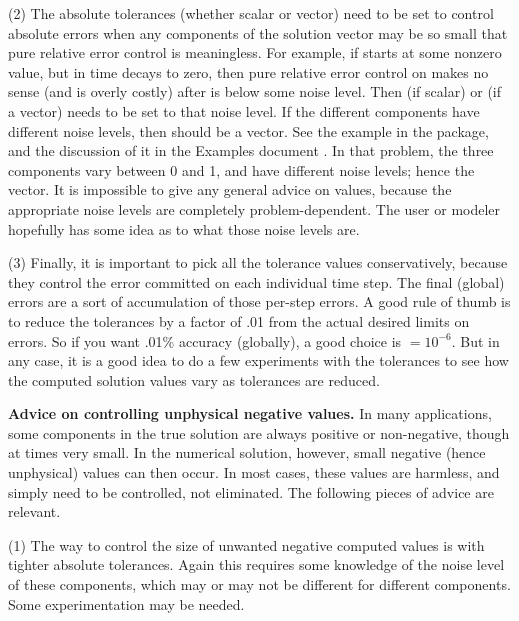(2) The absolute tolerances  (whether scalar or vector) need to
be set to control absolute errors when any components of the solution
vector  may be so small that pure relative error control is
meaningless.  For example, if  starts at some nonzero value, but in time
decays to zero, then pure relative error control on  makes no sense
(and is overly costly) after  is below some noise level.  Then
 (if scalar) or  (if a vector) needs to be set to that
noise level.  If the different components have different noise levels,
then  should be a vector.  See the example  in the
{\ida} package, and the discussion of it in the {\ida} Examples document
\cite{ida_ex}.
In that problem, the three components vary between 0 and 1, and have
different noise levels; hence the  vector.  It is impossible to
give any general advice on  values, because the appropriate noise
levels are completely problem-dependent.  The user or modeler hopefully has
some idea as to what those noise levels are.

(3) Finally, it is important to pick all the tolerance values conservatively,
because they control the error committed on each individual time step.
The final (global) errors are a sort of accumulation of those
per-step errors.  A good rule of thumb is to reduce the tolerances by a
factor of .01 from the actual desired limits on errors.  So if you
want .01\% accuracy (globally), a good choice is $=10^{-6}$.
But in any case, it is a good idea to do a few experiments with
the tolerances to see how the computed solution values vary as
tolerances are reduced.

\vspace{0.1in}
{\bf Advice on controlling unphysical negative values.}
In many applications, some components in the true solution are always
positive or non-negative, though at times very small.  In the numerical
solution, however, small negative (hence unphysical) values can then
occur.  In most cases, these values are harmless, and simply need to
be controlled, not eliminated. The following pieces of advice are relevant.

(1) The way to control the size of unwanted negative computed values
is with tighter absolute tolerances.  Again this requires some
knowledge of the noise level of these components, which may or may not
be different for different components.  Some experimentation may be
needed.

